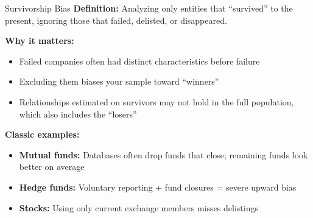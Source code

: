 \documentclass[10pt]{beamer}
\newcommand{\highlight}[1]{\textcolor{AccentOrange}{\textbf{#1}}}
\begin{document}
\begin{frame}{Survivorship Bias}
  \textbf{Definition:} Analyzing only entities that ``survived'' to the present, ignoring those that failed, delisted, or disappeared.
  
  \vspace{1em}
  \highlight{Why it matters:}
  \begin{itemize}
    \item Failed companies often had distinct characteristics before failure
    \item Excluding them biases your sample toward ``winners''
    \item Relationships estimated on survivors may not hold in the full population, which also includes the ``losers''
  \end{itemize}
  
  \vspace{1em}
  \textbf{Classic examples:}
  \begin{itemize}
    \item \textbf{Mutual funds:} Databases often drop funds that close; remaining funds look better on average
    \item \textbf{Hedge funds:} Voluntary reporting + fund closures = severe upward bias
    \item \textbf{Stocks:} Using only current exchange members misses delistings
  \end{itemize}

\end{frame}
\end{document}
